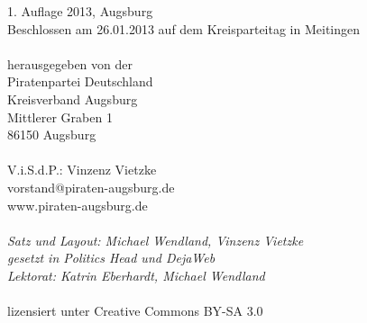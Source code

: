 \thispagestyle{empty}
\vspace*{\fill}
\begin{minipage}{\textwidth}
  \begin{small}
    \begin{singlespace}
       1. Auflage 2013, Augsburg\\
       Beschlossen am 26.01.2013 auf dem Kreisparteitag in Meitingen\\
       \\
       herausgegeben von der\\
       Piratenpartei Deutschland\\
       Kreisverband Augsburg\\
       Mittlerer Graben 1\\
       86150 Augsburg\\
       \\
       V.i.S.d.P.: Vinzenz Vietzke\\
       vorstand@piraten-augsburg.de\\
       www.piraten-augsburg.de\\
       \\
       \textit{
         Satz und Layout: Michael Wendland, Vinzenz Vietzke\\
         gesetzt in Politics Head und DejaWeb\\
         Lektorat: Katrin Eberhardt, Michael Wendland
       }\\
       \\
       lizensiert unter Creative Commons BY-SA 3.0
    \end{singlespace}
  \end{small}
\end{minipage}